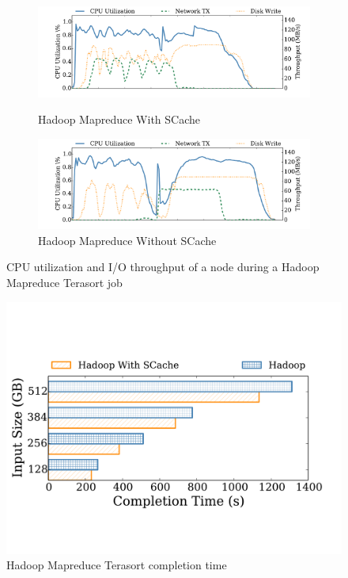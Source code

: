 \begin{figure}
	\centering
	\begin{minipage}[hb]{\linewidth}
		\begin{subfigure}{\linewidth}
			\begin{minipage}{\linewidth}
				\includegraphics[width=\linewidth]{fig/hadoop_terasort_scache}
				\caption{\color{blue}Hadoop Mapreduce With SCache}
				\label{fig:hadoop_terasort_scache}
			\end{minipage}
			\begin{minipage}{\linewidth}
				\includegraphics[width=\linewidth]{fig/hadoop_terasort_origin}
				\caption{\color{blue}Hadoop Mapreduce Without SCache}
				\label{fig:hadoop_terasort_origin}
			\end{minipage}
		\end{subfigure}
		\caption{\color{blue}CPU utilization and I/O throughput of a node during a Hadoop Mapreduce Terasort job}
		\label{fig:hadoop_terasort}
	\end{minipage}
\end{figure}

\begin{figure}
	\includegraphics[width=\linewidth]{fig/hadoop_terasort_time}
	\caption{\color{blue}Hadoop Mapreduce Terasort completion time}
	\label{fig:hadoop_terasort_time}
\end{figure}

